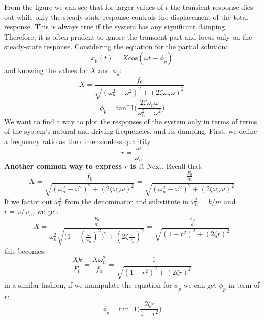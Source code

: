 \documentclass[12pt,letter]{article}
\numberwithin{ex}{section} %
\numberwithin{re}{section} %
\begin{document}
			From the figure we can see that for larger values of $t$ the transient response dies out while only the steady state response controls the displacement of the total response. This is always true if the system has any significant damping. Therefore, it is often prudent to ignore the transient part and focus only on the steady-state response. Considering the equation for the partial solution: 
			\begin{equation}
				x_p(t) = X \text{cos}(\omega t - \phi_p)
			\end{equation}			 
			and knowing the values for $X$ and $\phi_p$: 
			\begin{equation}
				X = \frac{f_0}{\sqrt{(\omega_n^2 - \omega^2)^2 +  (2\zeta \omega_n \omega)^2}} 
			\end{equation}	
			\begin{equation}
				\phi_p = \text{tan}^-1\bigg(\frac{2\zeta \omega_n \omega}{\omega_n^2 - \omega^2}\bigg)
			\end{equation}	
			We want to find a way to plot the responses of the system only in terms of terms of the system's natural and driving frequencies, and its damping. First, we define a frequency ratio as the dimensionless quantity 
			\begin{equation}
				r = \frac{\omega}{\omega_n}
			\end{equation}
			\textbf{Another common way to express $r$ is $\beta$}. Next, Recall that:
			\begin{equation}
				X = \frac{f_0}{\sqrt{(\omega_n^2 - \omega^2)^2 +  (2\zeta \omega_n \omega)^2}}  = \frac{\frac{F_0}{m}}{\sqrt{(\omega_n^2 - \omega^2)^2 +  (2\zeta \omega_n \omega)^2}} 
			\end{equation}				
			If we factor out $\omega_n^2$ from the denominator and substitute in $\omega_n^2 = k/m$ and $r = \omega/\omega_n$, we get:
			\begin{equation}
				X = \frac{\frac{F_0}{m}}{\omega_n^2 \sqrt{\big(1 - (\frac{\omega}{\omega_n})^2\big)^2 +  (2\zeta \frac{\omega}{\omega_n})^2}} =  \frac{\frac{F_0}{k}}{\sqrt{(1-r^2)^2+(2\zeta r)^2}}
			\end{equation}				
			this becomes:
			\begin{equation}
				\frac{Xk}{F_0} = \frac{X \omega_n^2}{f_0} = \frac{1}{\sqrt{(1-r^2)^2+(2\zeta r)^2}}
			\end{equation}				
			in a similar fashion, if we manipulate the equation for $\phi_p$ we can get $\phi_p$ in term of $r$:
			\begin{equation}
				\phi_p = \text{tan}^-1\bigg(\frac{2 \zeta r}{1-r^2}\bigg)
			\end{equation}	
\end{document}
